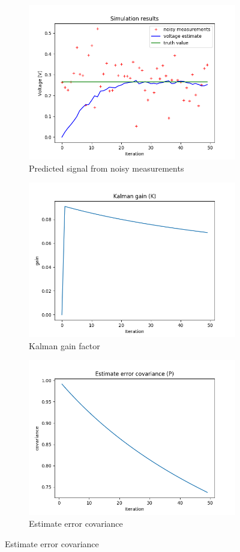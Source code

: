 \documentclass{article}
\begin{document}
    \begin{figure}[H]
        \begin{subfigure} {.5\textwidth}  
            \centering 
            \includegraphics[width=0.6\linewidth]{./img/r10q_.png}
            \caption{Predicted signal from noisy measurements }
        \end{subfigure}
        \begin{subfigure}{.5\textwidth}            
            \centering
            \includegraphics[width=0.6\linewidth]{./img/r10q_K.png}
            \caption{Kalman gain factor}
        \end{subfigure}
        \begin{subfigure} {.5\textwidth}  
            \centering 
            \includegraphics[width=0.6\linewidth]{./img/r10q_P.png}
            \caption{Estimate error covariance}

\end{subfigure}
\end{figure}
\end{document}
